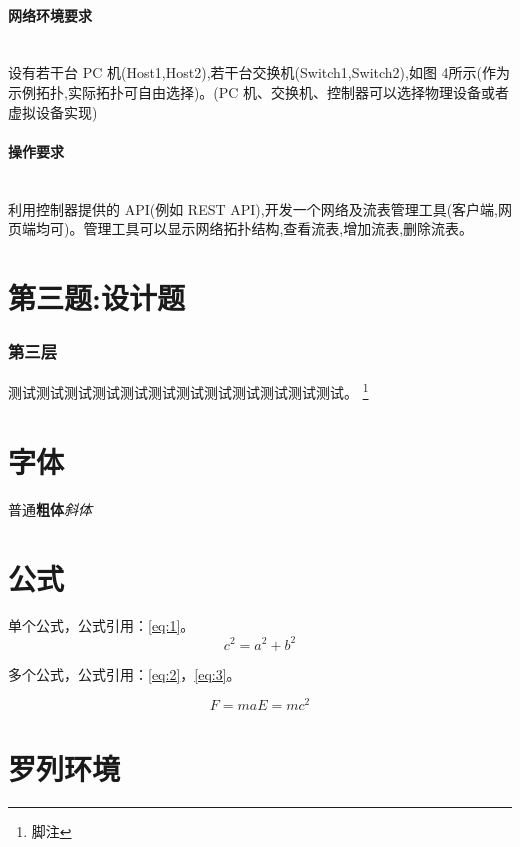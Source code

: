\documentclass[format=draft,language=chinese,category=SDN]{hustreport}
\newcommand{\myparagraph}[1]{\paragraph{#1}\mbox{}\\}
\begin{document}
\myparagraph{网络环境要求}

设有若干台 PC 机(Host1,Host2),若干台交换机(Switch1,Switch2),如图 4所示(作为示例拓扑,实际拓扑可自由选择)。(PC 机、交换机、控制器可以选择物理设备或者虚拟设备实现)

\myparagraph{操作要求}

利用控制器提供的 API(例如 REST API),开发一个网络及流表管理工具(客户端,网页端均可)。管理工具可以显示网络拓扑结构,查看流表,增加流表,删除流表。


\section{第三题:设计题}\label{sec:Q3}

\subsubsection{第三层}\label{sec:3}
测试测试测试测试测试测试测试测试测试测试测试测试。
\footnote{\label{footnote:1}脚注}

\section{字体}

普通\textbf{粗体}\emph{斜体}


\section{公式}

单个公式，公式引用：\autoref{eq:1}。
\begin{equation}
 c^2 = a^2 + b^2 \label{eq:1}
\end{equation}

多个公式，公式引用：\autoref{eq:2}，\autoref{eq:3}。

\begin{subequations}
\begin{equation}
  F = ma \label{eq:2}
\end{equation}
\begin{equation}
  E = mc^2 \label{eq:3}
\end{equation}
\end{subequations}

\section{罗列环境}
\end{document}
